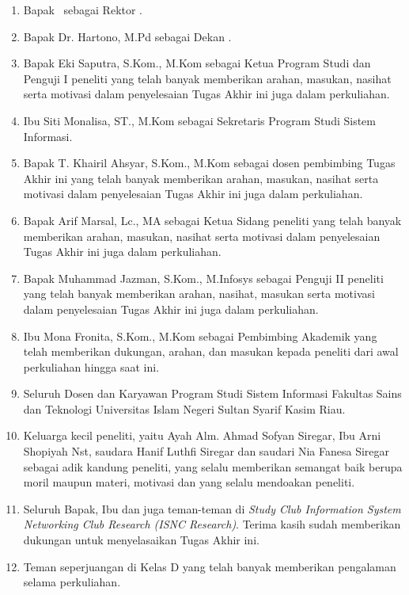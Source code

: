 \begin{enumerate}
	\item Bapak \rektor\  sebagai Rektor \universitas.
	\item Bapak Dr. Hartono, M.Pd sebagai Dekan \fakultas.
	\item Bapak Eki Saputra, S.Kom., M.Kom sebagai Ketua Program Studi \programStudi dan Penguji I peneliti yang telah banyak memberikan arahan, masukan, nasihat serta motivasi dalam penyelesaian Tugas Akhir ini juga dalam perkuliahan.
	\item Ibu Siti Monalisa, ST., M.Kom sebagai Sekretaris Program Studi Sistem Informasi.
	\item Bapak T. Khairil Ahsyar, S.Kom., M.Kom sebagai dosen pembimbing Tugas Akhir ini yang telah banyak memberikan arahan, masukan, nasihat serta motivasi dalam penyelesaian Tugas Akhir ini juga dalam perkuliahan.
	\item Bapak Arif Marsal, Lc., MA sebagai Ketua Sidang peneliti yang telah banyak memberikan arahan, masukan, nasihat serta motivasi dalam penyelesaian Tugas Akhir ini juga dalam perkuliahan.
	\item Bapak Muhammad Jazman, S.Kom., M.Infosys sebagai Penguji II peneliti yang telah banyak memberikan arahan, nasihat, masukan serta motivasi dalam penyelesaian Tugas Akhir ini juga dalam perkuliahan.
	\item Ibu Mona Fronita, S.Kom., M.Kom sebagai Pembimbing Akademik yang telah memberikan dukungan, arahan, dan masukan kepada peneliti dari awal perkuliahan hingga saat ini.
	\item Seluruh Dosen dan Karyawan Program Studi Sistem Informasi Fakultas Sains dan Teknologi Universitas Islam Negeri Sultan Syarif Kasim Riau.
	\item Keluarga kecil peneliti, yaitu Ayah Alm. Ahmad Sofyan Siregar, Ibu Arni Shopiyah Nst, saudara Hanif Luthfi Siregar dan saudari Nia Fanesa Siregar sebagai adik kandung peneliti, yang selalu memberikan semangat baik berupa moril maupun materi, motivasi dan yang selalu mendoakan peneliti.
	\item Seluruh Bapak, Ibu dan juga teman-teman di \textit{Study Club Information System Networking Club Research (ISNC Research)}. Terima kasih sudah memberikan dukungan untuk menyelasaikan Tugas Akhir ini.
	\item Teman seperjuangan di Kelas D yang telah banyak memberikan pengalaman selama perkuliahan.

\end{enumerate}
